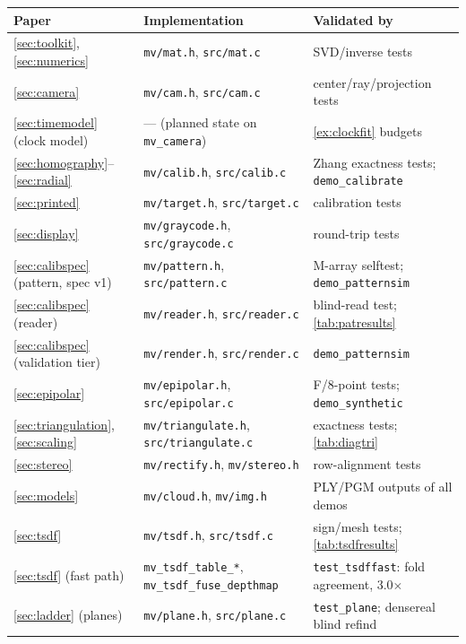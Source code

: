 \documentclass[11pt]{article}
\theoremstyle{definition}
\newcommand{\code}[1]{\texttt{#1}}
\begin{document}
\begin{table}[ht]
\centering
\scriptsize
\setlength{\tabcolsep}{3pt}
\begin{tabular}{l l l}
\toprule
Paper & Implementation & Validated by \\
\midrule
\autoref{sec:toolkit}, \autoref{sec:numerics} & \code{mv/mat.h}, \code{src/mat.c} & SVD/inverse tests \\
\autoref{sec:camera} & \code{mv/cam.h}, \code{src/cam.c} & center/ray/projection tests \\
\autoref{sec:timemodel} (clock model) & --- (planned state on \code{mv\_camera}) & \autoref{ex:clockfit} budgets \\
\autoref{sec:homography}--\autoref{sec:radial} & \code{mv/calib.h}, \code{src/calib.c} & Zhang exactness tests; \code{demo\_calibrate} \\
\autoref{sec:printed} & \code{mv/target.h}, \code{src/target.c} & calibration tests \\
\autoref{sec:display} & \code{mv/graycode.h}, \code{src/graycode.c} & round-trip tests \\
\autoref{sec:calibspec} (pattern, spec v1) & \code{mv/pattern.h}, \code{src/pattern.c} & M-array selftest; \code{demo\_patternsim} \\
\autoref{sec:calibspec} (reader) & \code{mv/reader.h}, \code{src/reader.c} & blind-read test; \autoref{tab:patresults} \\
\autoref{sec:calibspec} (validation tier) & \code{mv/render.h}, \code{src/render.c} & \code{demo\_patternsim} \\
\autoref{sec:epipolar} & \code{mv/epipolar.h}, \code{src/epipolar.c} & F/8-point tests; \code{demo\_synthetic} \\
\autoref{sec:triangulation}, \autoref{sec:scaling} & \code{mv/triangulate.h}, \code{src/triangulate.c} & exactness tests; \autoref{tab:diagtri} \\
\autoref{sec:stereo} & \code{mv/rectify.h}, \code{mv/stereo.h} & row-alignment tests \\
\autoref{sec:models} & \code{mv/cloud.h}, \code{mv/img.h} & PLY/PGM outputs of all demos \\
\autoref{sec:tsdf} & \code{mv/tsdf.h}, \code{src/tsdf.c} & sign/mesh tests; \autoref{tab:tsdfresults} \\
\autoref{sec:tsdf} (fast path) & \code{mv\_tsdf\_table\_*}, \code{mv\_tsdf\_fuse\_depthmap} & \code{test\_tsdffast}: fold agreement, 3.0\(\times\) \\
\autoref{sec:ladder} (planes) & \code{mv/plane.h}, \code{src/plane.c} & \code{test\_plane}; densereal blind refind \\

\end{tabular}
\end{table}
\end{document}
